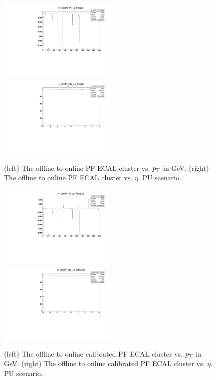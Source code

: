 \begin{figure}
\includegraphics[width=0.495\textwidth]{./plots_pdf/ECAL_plots/Prod6/PU/H_GenPi_Pt_vs_RespE.pdf}
\includegraphics[width=0.495\textwidth]{./plots_pdf/ECAL_plots/Prod6/PU/H_GenPi_Eta_vs_RespE.pdf}
\caption [HLT vs. offline PF ECAL cluster - PU scenario]{(left) The offline to online PF ECAL cluster vs. $p_{\mathrm{T}}$ in GeV. (right) The offline to online PF ECAL cluster vs. $\eta$. PU scenario.}
\label{fig:PU_ECAL_Offline_vs_Online_E}
\end{figure}

\begin{figure}
\includegraphics[width=0.495\textwidth]{./plots_pdf/ECAL_plots/Prod6/PU/H_GenPi_Pt_vs_RespCE.pdf}
\includegraphics[width=0.495\textwidth]{./plots_pdf/ECAL_plots/Prod6/PU/H_GenPi_Eta_vs_RespCE.pdf}
\caption[HLT vs. offline calibrated PF ECAL cluster - PU scenario]{(left) The offline to online calibrated PF ECAL cluster vs. $p_{\mathrm{T}}$ in GeV. (right) The offline to online calibrated PF ECAL cluster vs. $\eta$. PU scenario.}
\label{fig:PU_ECAL_Offline_vs_Online_CE}
\end{figure}       
